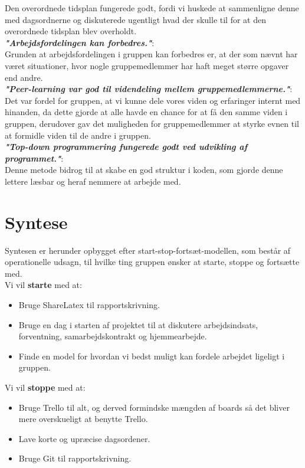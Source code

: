 \documentclass[oneside,a4paper,titlepage]{article}
\begin{document}
Den overordnede tidsplan fungerede godt, fordi vi huskede at sammenligne denne med dagsordnerne og diskuterede ugentligt hvad der skulle til for at den overordnede tidsplan blev overholdt.  \\

\textbf{\textit{"Arbejdsfordelingen kan forbedres."}}: \\

Grunden at arbejdsfordelingen i gruppen kan forbedres er, at der som nævnt har været situationer, hvor nogle gruppemedlemmer har haft meget større opgaver end andre.  \\

\textbf{\textit{"Peer-learning var god til videndeling mellem gruppemedlemmerne."}}: \\

Det var fordel for gruppen, at vi kunne dele vores viden og erfaringer internt med hinanden, da dette gjorde at alle havde en chance for at få den samme viden i gruppen, derudover gav det muligheden for gruppemedlemmer at styrke evnen til at formidle viden til de andre i gruppen. \\

\textbf{\textit{"Top-down programmering fungerede godt ved udvikling af programmet."}}: \\

Denne metode bidrog til at skabe en god struktur i koden, som gjorde denne lettere læsbar og heraf nemmere at arbejde med.


\section{Syntese}
Syntesen er herunder opbygget efter start-stop-fortsæt-modellen, som består af operationelle udsagn, til hvilke ting gruppen ønsker at starte, stoppe og fortsætte med.\\

Vi vil \textbf{starte} med at:
\begin{itemize}
  \item Bruge ShareLatex til rapportskrivning. 
  \item Bruge en dag i starten af projektet til at diskutere arbejdsindsats, forventning, samarbejdskontrakt og hjemmearbejde. 
  \item Finde en model for hvordan vi bedst muligt kan fordele arbejdet ligeligt i gruppen.  
\end{itemize}

Vi vil \textbf{stoppe} med at:
\begin{itemize}
  \item Bruge Trello til alt, og derved formindske mængden af boards så det bliver mere overskueligt at benytte Trello.
  \item Lave korte og upræcise dagsordener.
  \item Bruge Git til rapportskrivning.
\end{itemize}
\end{document}
